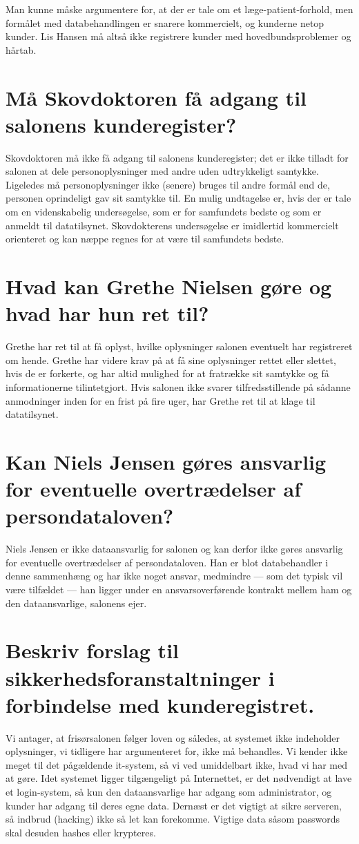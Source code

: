 \documentclass{article}
\begin{document}
Man kunne måske argumentere for, at der er tale om et læge-patient-forhold, men formålet med databehandlingen er snarere kommercielt, og kunderne netop kunder. Lis Hansen må altså ikke registrere kunder med hovedbundsproblemer og hårtab.

\section{Må Skovdoktoren få adgang til salonens kunderegister?}
Skovdoktoren må ikke få adgang til salonens kunderegister; det er ikke tilladt for salonen at dele personoplysninger med andre uden udtrykkeligt samtykke. Ligeledes må personoplysninger ikke (senere) bruges til andre formål end de, personen oprindeligt gav sit samtykke til. En mulig undtagelse er, hvis der er tale om en videnskabelig undersøgelse, som er for samfundets bedste og som er anmeldt til datatilsynet. Skovdokterens undersøgelse er imidlertid kommercielt orienteret og kan næppe regnes for at være til samfundets bedste.

\section{Hvad kan Grethe Nielsen gøre og hvad har hun ret til?}
Grethe har ret til at få oplyst, hvilke oplysninger salonen eventuelt har registreret om hende. Grethe har videre krav på at få sine oplysninger rettet eller slettet, hvis de er forkerte, og har altid mulighed for at fratrække sit samtykke og få informationerne tilintetgjort. Hvis salonen ikke svarer tilfredsstillende på sådanne anmodninger inden for en frist på fire uger, har Grethe ret til at klage til datatilsynet.

\section{Kan Niels Jensen gøres ansvarlig for eventuelle overtrædelser af persondataloven?}
Niels Jensen er ikke dataansvarlig for salonen og kan derfor ikke gøres ansvarlig for eventuelle overtrædelser af persondataloven. Han er blot databehandler i denne sammenhæng og har ikke noget ansvar, medmindre --- som det typisk vil være tilfældet --- han ligger under en ansvarsoverførende kontrakt mellem ham og den dataansvarlige, salonens ejer.

\section{Beskriv forslag til sikkerhedsforanstaltninger i forbindelse med kunderegistret.}

Vi antager, at frisørsalonen følger loven og således, at systemet ikke indeholder oplysninger, vi tidligere har argumenteret for, ikke må behandles. Vi kender ikke meget til det pågældende it-system, så vi ved umiddelbart ikke, hvad vi har med at gøre. Idet systemet ligger tilgængeligt på Internettet, er det nødvendigt at lave et login-system, så kun den dataansvarlige har adgang som administrator, og kunder har adgang til deres egne data. Dernæst er det vigtigt at sikre serveren, så indbrud (hacking) ikke så let kan forekomme. Vigtige data såsom passwords skal desuden hashes eller krypteres.
\end{document}
